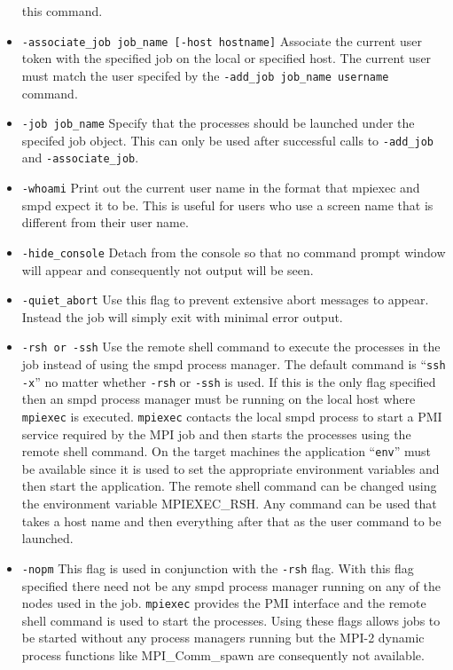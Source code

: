 \documentclass[dvipdfm,11pt]{article}
\begin{document}
\begin{itemize}
this command.
\item \texttt{-associate\_job job\_name [-host hostname]}
Associate the current user token with the specified job on the local or specified
host.  The current user must match the user specifed by the \texttt{-add\_job job\_name username}
command.
\item \texttt{-job job\_name}
Specify that the processes should be launched under the specifed job object.
This can only be used after successful calls to \texttt{-add\_job} and \texttt{-associate\_job}.
\item \texttt{-whoami}
Print out the current user name in the format that mpiexec and smpd expect it to be.
This is useful for users who use a screen name that is different from their user
name.
\item \texttt{-hide\_console}
Detach from the console so that no command prompt window will appear and consequently
not output will be seen.
\item \texttt{-quiet\_abort}
Use this flag to prevent extensive abort messages to appear.  Instead the job 
will simply exit with minimal error output.
\item \texttt{-rsh or -ssh}
Use the remote shell command to execute the processes in the job instead of
using the smpd process manager.  The default command is ``\texttt{ssh -x}'' no
matter whether \texttt{-rsh} or \texttt{-ssh} is used.  If this is the only
flag specified then an smpd process manager must be running on the local host
where \texttt{mpiexec} is executed.  \texttt{mpiexec} contacts the local smpd process to start
a PMI service required by the MPI job and then starts the processes using the 
remote shell command.  On the target machines the application ``\texttt{env}''
must be available since it is used to set the appropriate environment variables
and then start the application.  The remote shell command can be changed using
the environment variable MPIEXEC\_RSH.  Any command can be used that takes a 
host name and then everything after that as the user command to be launched.
\item \texttt{-nopm}
This flag is used in conjunction with the \texttt{-rsh} flag.  With this flag
specified there need not be any smpd process manager running on any of the nodes
used in the job.  \texttt{mpiexec} provides the PMI interface and the remote
shell command is used to start the processes.  Using these flags allows jobs to
be started without any process managers running but the MPI-2 dynamic process
functions like MPI\_Comm\_spawn are consequently not available.

\end{itemize}
\end{document}
